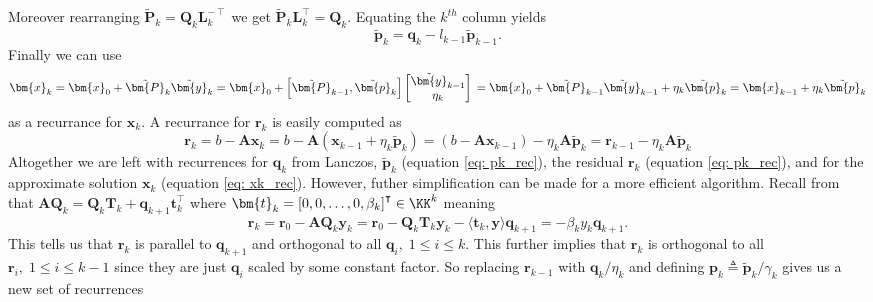 Moreover rearranging $\tilde{\bm{P}}_{k} = \bm{Q}_k \bm{L}_k^{-\intercal}$ we get $\tilde{\bm{P}}_{k} \bm{L}_k^{\intercal} = \bm{Q}_k$. Equating the $k^{th}$ column yields
\begin{equation} \label{eq: pk_rec}
    \tilde{\bm{p}}_{k} = \bm{q}_k - l_{k-1} \tilde{\bm{p}}_{k-1}.
\end{equation}
Finally we can use
\begin{equation} \label{eq: xk_rec}
    \bm{x}_k = \bm{x}_0 + \tilde{\bm{P}}_{k} \tilde{\bm{y}}_{k}                                 \\
    = \bm{x}_0 + \left[ \tilde{\bm{P}}_{k-1} , \tilde{\bm{p}}_{k} \right]
    \begin{bmatrix}
        \tilde{\bm{y}}_{k-1} \\
        \eta_k
    \end{bmatrix}                                                                    \\
    = \bm{x}_0 + \tilde{\bm{P}}_{k-1} \tilde{\bm{y}}_{k-1} + \eta_k \tilde{\bm{p}}_{k} \\
    = \bm{x}_{k-1} + \eta_k \tilde{\bm{p}}_{k}
\end{equation}
as a recurrance for $\bm{x}_k$. A recurrance for $\bm{r}_k$ is easily computed as
\begin{equation} \label{eq: rk_rec}
    \bm{r}_{k} = b - \bm{A} \bm{x}_k = b - \bm{A} \left( \bm{x}_{k-1} + \eta_k \tilde{\bm{p}}_{k} \right) = \left( b - \bm{A} \bm{x}_{k-1} \right) - \eta_k \bm{A} \tilde{\bm{p}}_{k} = \bm{r}_{k-1} - \eta_k \bm{A} \tilde{\bm{p}}_{k}
\end{equation}
Altogether we are left with recurrences for $\bm{q}_k$ from Lanczos, $\tilde{\bm{p}}_{k}$ (equation \ref{eq: pk_rec}), the residual $\bm{r}_k$ (equation \ref{eq: pk_rec}),  and for the approximate solution $\bm{x}_k$ (equation \ref{eq: xk_rec}). However, futher simplification can be made for a more efficient algorithm. Recall from  that $\bm{A} \bm{Q}_k =  \bm{Q}_k \bm{T}_k + \bm{q}_{k+1} \bm{t}_{k}^{\intercal}$ where $\bm{t}_k = \left[ 0,0, \ldots , 0, \beta_k \right]^{\intercal} \in \KK^k$ meaning
\[
    \bm{r}_k = \bm{r}_0 - \bm{A} \bm{Q}_k \bm{y}_k = \bm{r}_0 - \bm{Q}_k \bm{T}_k \bm{y}_k - \langle \bm{t}_k , \bm{y} \rangle \bm{q}_{k+1} = - \beta_k y_k \bm{q}_{k+1}.
\]
This tells us that $\bm{r}_k$ is parallel to $\bm{q}_{k+1}$ and orthogonal to all $\bm{q}_{i}, \; 1 \leq i \leq k$. This further implies that $\bm{r}_k$ is orthogonal to all $\bm{r}_i, \; 1 \leq i \leq k-1$ since they are just $\bm{q}_{i}$ scaled by some constant factor. So replacing $\bm{r}_{k-1}$ with $\bm{q}_k / \eta_k$ and defining $\bm{p}_k \triangleq \tilde{\bm{p}}_k / \gamma_k$ gives us a new set of recurrences

